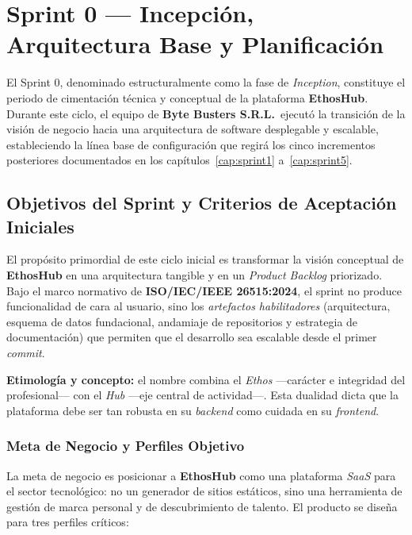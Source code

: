 \chapter{Sprint 0 — Incepción, Arquitectura Base y Planificación}
\label{cap:sprint0}

El Sprint 0, denominado estructuralmente como la fase de \textit{Inception}, constituye el
periodo de cimentación técnica y conceptual de la plataforma \textbf{EthosHub}. Durante este
ciclo, el equipo de \textbf{Byte Busters S.R.L.}\ ejecutó la transición de la visión de
negocio hacia una arquitectura de software desplegable y escalable, estableciendo la línea
base de configuración que regirá los cinco incrementos posteriores documentados en los
capítulos~\ref{cap:sprint1} a~\ref{cap:sprint5}.\par

\section{Objetivos del Sprint y Criterios de Aceptación Iniciales}
\label{sec:s0_objetivos}

El propósito primordial de este ciclo inicial es transformar la visión conceptual de
\textbf{EthosHub} en una arquitectura tangible y en un \textit{Product Backlog} priorizado.
Bajo el marco normativo de \textbf{ISO/IEC/IEEE 26515:2024}, el sprint no produce
funcionalidad de cara al usuario, sino los \textit{artefactos habilitadores} (arquitectura,
esquema de datos fundacional, andamiaje de repositorios y estrategia de documentación) que
permiten que el desarrollo sea escalable desde el primer \textit{commit}.\par

\textbf{Etimología y concepto:} el nombre combina el \textit{Ethos} —carácter e integridad
del profesional— con el \textit{Hub} —eje central de actividad—. Esta dualidad dicta que la
plataforma debe ser tan robusta en su \textit{backend} como cuidada en su \textit{frontend}.

\subsection{Meta de Negocio y Perfiles Objetivo}
\label{ssec:s0_meta}
La meta de negocio es posicionar a \textbf{EthosHub} como una plataforma \textit{SaaS} para
el sector tecnológico: no un generador de sitios estáticos, sino una herramienta de gestión
de marca personal y de descubrimiento de talento. El producto se diseña para tres perfiles
críticos:

